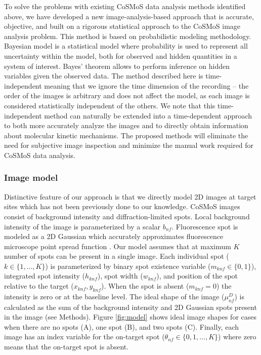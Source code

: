 To solve the problems with existing CoSMoS data analysis methods identified above, we have developed a new image-analysis-based approach that is accurate, objective, and built on a rigorous statistical approach to the CoSMoS image analysis problem. This method is based on probabilistic modeling methodology. Bayesian model is a statistical model where probability is used to represent all uncertainty within the model, both for observed and hidden quantities in a system of interest. Bayes' theorem allows to perform inference on hidden variables given the observed data. The method described here is time-independent meaning that we ignore the time dimension of the recording -- the order of the images is arbitrary and does not affect the model, as each image is considered statistically independent of the others. We note that this time-independent method can naturally be extended into a time-dependent approach to both more accurately analyze the images and to directly obtain information about molecular kinetic mechanisms.  The proposed methods will eliminate the need for subjective image inspection and minimize the manual work required for CoSMoS data analysis.

\subsubsection{Image model}

Distinctive feature of our approach is that we directly model 2D images at target sites which has not been previously done to our knowledge. CoSMoS images consist of background intensity and diffraction-limited spots. Local background intensity of the image is parameterized by a scalar $b_{nf}$. Fluorescence spot is modeled as a 2D Gaussian which accurately approximates fluorescence microscope point spread function \citep{Zhang2007-rb}. Our model assumes that at maximum $K$ number of spots can be present in a single image. Each individual spot ($k \in \{1,\dots,K\}$) is parameterized by binary spot existence variable ($m_{knf} \in \{0,1\}$), integrated spot intensity ($h_{knf}$), spot width ($w_{knf}$), and position of the spot relative to the target ($x_{knf},y_{knf}$). When the spot is absent ($m_{knf}=0$) the intensity is zero or at the baseline level. The ideal shape of the image ($\mu^D_{nf}$) is calculated as the sum of the background intensity and 2D Gaussian spots present in the image (see Methods). Figure \ref{fig:model} shows ideal image shapes for cases when there are no spots (A), one spot (B), and two spots (C). Finally, each image has an index variable for the on-target spot ($\theta_{nf} \in \{0,1,\dots,K\}$) where zero means that the on-target spot is absent.

